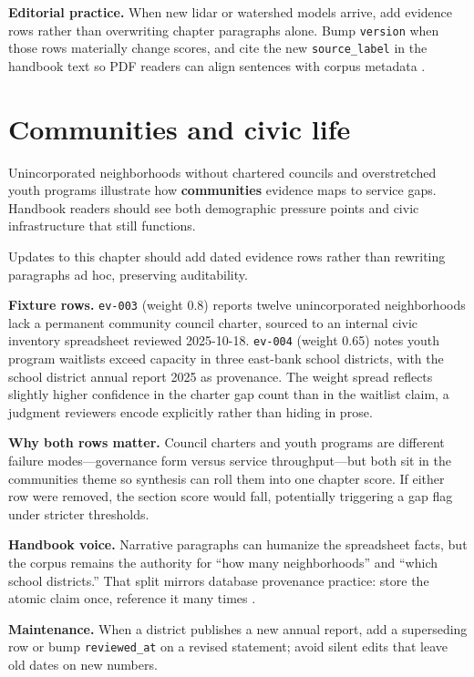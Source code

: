 \documentclass[
]{article}
\begin{document}
\textbf{Editorial practice.} When new lidar or watershed models arrive,
add evidence rows rather than overwriting chapter paragraphs alone. Bump
\texttt{version} when those rows materially change scores, and cite the
new \texttt{source\_label} in the handbook text so PDF readers can align
sentences with corpus metadata \citep{edwards2010}.

\newpage

\section{Communities and civic life}\label{communities-and-civic-life}

Unincorporated neighborhoods without chartered councils and
overstretched youth programs illustrate how \textbf{communities}
evidence maps to service gaps. Handbook readers should see both
demographic pressure points and civic infrastructure that still
functions.

Updates to this chapter should add dated evidence rows rather than
rewriting paragraphs ad hoc, preserving auditability.

\textbf{Fixture rows.} \texttt{ev-003} (weight 0.8) reports twelve
unincorporated neighborhoods lack a permanent community council charter,
sourced to an internal civic inventory spreadsheet reviewed 2025-10-18.
\texttt{ev-004} (weight 0.65) notes youth program waitlists exceed
capacity in three east-bank school districts, with the school district
annual report 2025 as provenance. The weight spread reflects slightly
higher confidence in the charter gap count than in the waitlist claim, a
judgment reviewers encode explicitly rather than hiding in prose.

\textbf{Why both rows matter.} Council charters and youth programs are
different failure modes---governance form versus service
throughput---but both sit in the communities theme so synthesis can roll
them into one chapter score. If either row were removed, the section
score would fall, potentially triggering a gap flag under stricter
thresholds.

\textbf{Handbook voice.} Narrative paragraphs can humanize the
spreadsheet facts, but the corpus remains the authority for ``how many
neighborhoods'' and ``which school districts.'' That split mirrors
database provenance practice: store the atomic claim once, reference it
many times \citep{gray2005}.

\textbf{Maintenance.} When a district publishes a new annual report, add
a superseding row or bump \texttt{reviewed\_at} on a revised statement;
avoid silent edits that leave old dates on new numbers.
\end{document}

